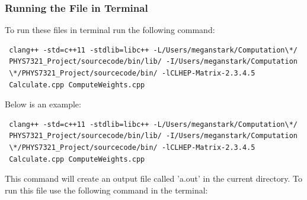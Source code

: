 \documentclass{article}
\begin{document}

\subsubsection{Running the File in Terminal}   
   
To run these files in terminal run the following command: %

\begin{verbatim} 
 clang++ -std=c++11 -stdlib=libc++ -L/Users/meganstark/Computation\*/
 PHYS7321_Project/sourcecode/bin/lib/ -I/Users/meganstark/Computation
 \*/PHYS7321_Project/sourcecode/bin/ -lCLHEP-Matrix-2.3.4.5  
 Calculate.cpp ComputeWeights.cpp      
\end{verbatim}

Below is an example: 

\begin{verbatim} 
 clang++ -std=c++11 -stdlib=libc++ -L/Users/meganstark/Computation\*/
 PHYS7321_Project/sourcecode/bin/lib/ -I/Users/meganstark/Computation
 \*/PHYS7321_Project/sourcecode/bin/ -lCLHEP-Matrix-2.3.4.5  
 Calculate.cpp ComputeWeights.cpp      
\end{verbatim}
      
      
      This command will create an output file called 'a.out' in the current directory. To run this file use the following command in the terminal:
      
\end{document}

